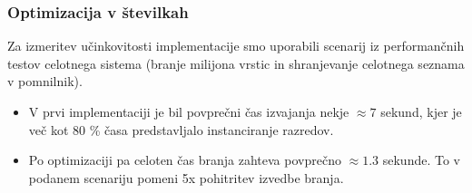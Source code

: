 \documentclass[a4paper,12pt,openright]{book}
\begin{document}
        \subsubsection{Optimizacija v številkah}
        Za izmeritev učinkovitosti implementacije smo uporabili scenarij iz performančnih testov celotnega sistema (branje milijona vrstic in shranjevanje celotnega seznama v pomnilnik).
        \begin{itemize}
            \item V prvi implementaciji je bil povprečni čas izvajanja nekje $\approx 7$ sekund, kjer je več kot $80$ \% časa predstavljalo instanciranje razredov.
            \item Po optimizaciji pa celoten čas branja zahteva povprečno $\approx 1.3$ sekunde. To v podanem scenariju pomeni 5x pohitritev izvedbe branja.
        \end{itemize}
\end{document}
